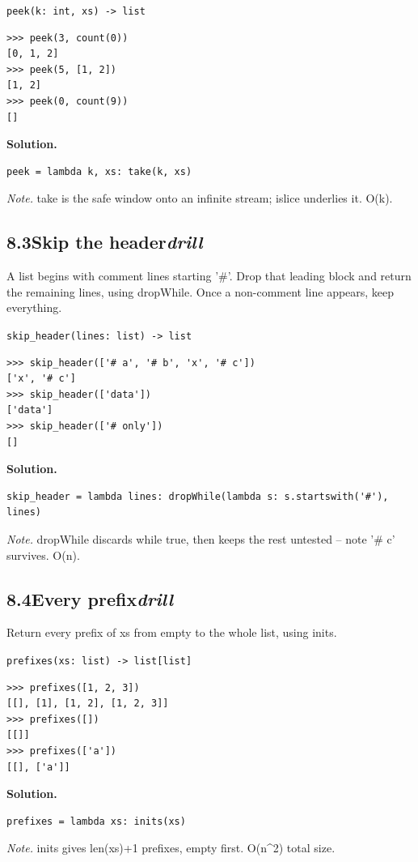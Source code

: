 \documentclass[10pt,letterpaper]{book}
\begin{document}
\noindent\texttt{peek(k: int, xs) -> list}
\begin{lstlisting}[style=ex]
>>> peek(3, count(0))
[0, 1, 2]
>>> peek(5, [1, 2])
[1, 2]
>>> peek(0, count(9))
[]
\end{lstlisting}
\noindent\textbf{Solution.}
\begin{lstlisting}[style=code]
peek = lambda k, xs: take(k, xs)
\end{lstlisting}
\noindent\textit{Note.} take is the safe window onto an infinite stream; islice underlies it. O(k).

\subsection*{8.3\quad Skip the header\hfill\textnormal{\textit{drill}}}
A list begins with comment lines starting '\#'. Drop that leading block and return the remaining lines, using dropWhile. Once a non-comment line appears, keep everything.

\noindent\texttt{skip\_header(lines: list) -> list}
\begin{lstlisting}[style=ex]
>>> skip_header(['# a', '# b', 'x', '# c'])
['x', '# c']
>>> skip_header(['data'])
['data']
>>> skip_header(['# only'])
[]
\end{lstlisting}
\noindent\textbf{Solution.}
\begin{lstlisting}[style=code]
skip_header = lambda lines: dropWhile(lambda s: s.startswith('#'), lines)
\end{lstlisting}
\noindent\textit{Note.} dropWhile discards while true, then keeps the rest untested -- note '\# c' survives. O(n).


\subsection*{8.4\quad Every prefix\hfill\textnormal{\textit{drill}}}
Return every prefix of xs from empty to the whole list, using inits.

\noindent\texttt{prefixes(xs: list) -> list[list]}
\begin{lstlisting}[style=ex]
>>> prefixes([1, 2, 3])
[[], [1], [1, 2], [1, 2, 3]]
>>> prefixes([])
[[]]
>>> prefixes(['a'])
[[], ['a']]
\end{lstlisting}
\noindent\textbf{Solution.}
\begin{lstlisting}[style=code]
prefixes = lambda xs: inits(xs)
\end{lstlisting}
\noindent\textit{Note.} inits gives len(xs)+1 prefixes, empty first. O(n\^{}2) total size.
\end{document}
